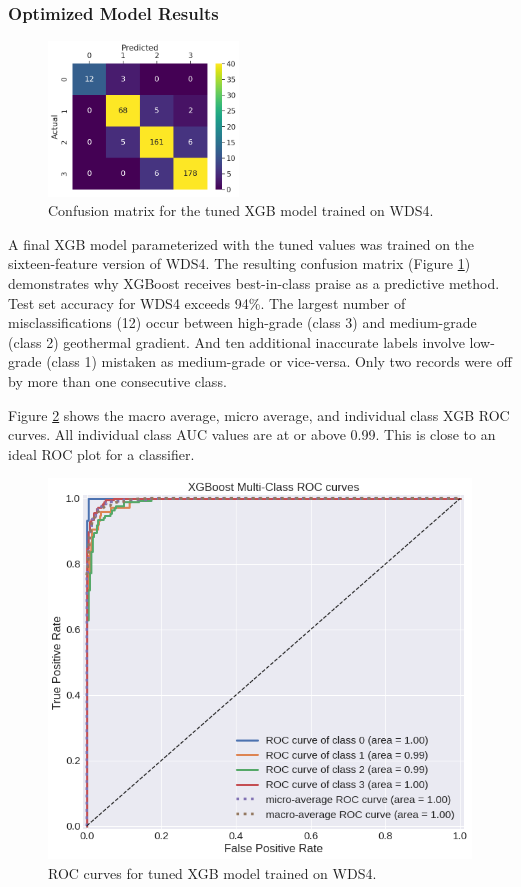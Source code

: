 \subsubsection{Optimized Model Results}\label{ch5:xgb_final_model}
\begin{figure}
\centering
\includegraphics[width=0.45\textwidth]{templates/images/Figure-XGB16-ConfusionMatrix.png}
\singlespacing
\caption[XGBoost confusion matrix]{Confusion matrix for the tuned XGB model trained on WDS4.}
\label{fig:xgb_conf_matrix}
\end{figure}
A final XGB model parameterized with the tuned values was trained on the sixteen-feature version of WDS4. The resulting confusion matrix (Figure \ref{fig:xgb_conf_matrix}) demonstrates why XGBoost receives best-in-class praise as a predictive method. Test set accuracy for WDS4 exceeds 94\%. The largest number of misclassifications (12) occur between high-grade (class 3) and medium-grade (class 2) geothermal gradient. And ten additional inaccurate labels involve low-grade (class 1) mistaken as medium-grade or vice-versa. Only two records were off by more than one consecutive class. 

Figure \ref{fig:xgb_auc} shows the macro average, micro average, and individual class XGB ROC curves. All individual class AUC values are at or above 0.99. This is close to an ideal ROC plot for a classifier.

\begin{figure}[htp]
\centering
\includegraphics[width=.5\textwidth]{templates/images/Figure-XGB16-AUC.png}
\caption[XGBoost ROC curves]{ROC curves for tuned XGB model trained on WDS4.}
\label{fig:xgb_auc}
\end{figure}

